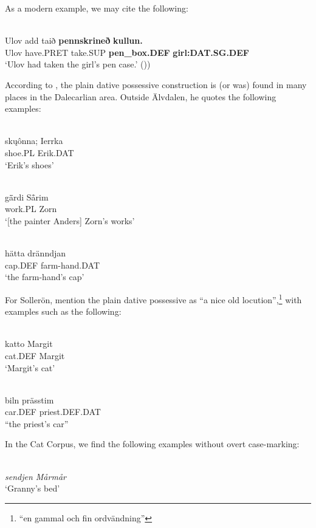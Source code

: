 As a modern example, we may cite the following:

\ea\label{}
\\
\gll Ulov  add  taið  \textbf{pennskrineð} \textbf{kullun.}\\
Ulov  have.PRET  take.SUP  \textbf{pen\_box.DEF} \textbf{girl:DAT.SG.DEF}\\
\glt ‘Ulov had taken the girl’s pen case.’ (\citet[120]{Åkerberg2012}))
\z

According to \citet[112]{Levander1928}, the plain dative possessive construction is (or was) found in many places in the Dalecarlian area. Outside Älvdalen, he quotes the following examples:

\ea\label{}
\\
\gll sk\k{u}ônna;  Ierrka\\
shoe.PL  Erik.DAT\\
\glt ‘Erik’s shoes’
\z

\ea\label{}
\\
\gll g\={ä}rdi  S\={å}rim\\
work.PL  Zorn\\
\glt ‘[the painter Anders] Zorn’s works’ 
\z

\ea\label{}
\\
\gll hätta  dränndjan\\
cap.DEF  farm-hand.DAT\\
\glt ‘the farm-hand’s cap’
\z

For Sollerön, \citet[357]{AnderssonEtAl1999} mention the plain dative possessive as “a nice old locution”,\footnote{ “en gammal och fin ordvändning”} with examples such as the following:

\ea\label{}
\\
\gll katto  Margit\\
cat.DEF  Margit\\
\glt ‘Margit’s cat’
\z

\ea\label{}
\\
\gll biln  prässtim\\
car.DEF  priest.DEF.DAT\\
\glt “the priest’s car”
\z

In the Cat Corpus, we find the following examples without overt case-marking:

\ea 
\ea 
{}\\
\gl \textit{sendjen Mårmår}\\
\glt ‘Granny’s bed’

